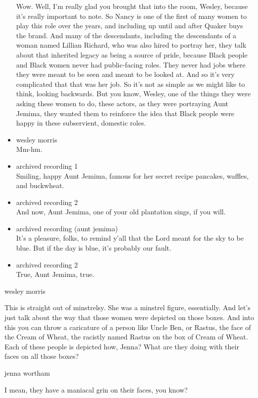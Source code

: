 \begin{itemize}
  Wow. Well, I'm really glad you brought that into the room, Wesley,
  because it's really important to note. So Nancy is one of the first of
  many women to play this role over the years, and including up until
  and after Quaker buys the brand. And many of the descendants,
  including the descendants of a woman named Lillian Richard, who was
  also hired to portray her, they talk about that inherited legacy as
  being a source of pride, because Black people and Black women never
  had public-facing roles. They never had jobs where they were meant to
  be seen and meant to be looked at. And so it's very complicated that
  that was her job. So it's not as simple as we might like to think,
  looking backwards. But you know, Wesley, one of the things they were
  asking these women to do, these actors, as they were portraying Aunt
  Jemima, they wanted them to reinforce the idea that Black people were
  happy in these subservient, domestic roles.
\item
  wesley morris\\
  Mm-hm.
\item
  archived recording 1\\
  Smiling, happy Aunt Jemima, famous for her secret recipe pancakes,
  waffles, and buckwheat.
\item
  archived recording 2\\
  And now, Aunt Jemima, one of your old plantation sings, if you will.
\item
  archived recording (aunt jemima)\\
  It's a pleasure, folks, to remind y'all that the Lord meant for the
  sky to be blue. But if the day is blue, it's probably our fault.
\item
  archived recording 2\\
  True, Aunt Jemima, true.
\end{itemize}

wesley morris

This is straight out of minstrelsy. She was a minstrel figure,
essentially. And let's just talk about the way that those women were
depicted on those boxes. And into this you can throw a caricature of a
person like Uncle Ben, or Rastus, the face of the Cream of Wheat, the
racistly named Rastus on the box of Cream of Wheat. Each of these people
is depicted how, Jenna? What are they doing with their faces on all
those boxes?

jenna wortham

I mean, they have a maniacal grin on their faces, you know?

